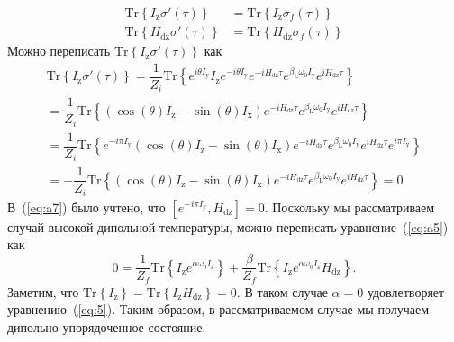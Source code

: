 \documentclass[utf8]{jetp}
\newcommand{\tr}[1]{\mathrm{Tr} \left\{ #1 \right\}}
\newcommand{\sx}{I_\mathrm{x}}
\newcommand{\sy}{I_\mathrm{y}}
\newcommand{\sz}{I_\mathrm{z}}
\newcommand{\hdz}{H_\mathrm{dz}}
\begin{document}
\begin{align}
  \label{eq:a5}
  \mathrm{Tr} \left\{ I_\mathrm{z} \sigma'(\tau) \right\}
  & = \mathrm{Tr} \left\{ I_\mathrm{z} \sigma_{f}(\tau) \right\}
  \\
  \label{eq:a6}
  \mathrm{Tr} \left\{ H_\mathrm{dz} \sigma'(\tau) \right\}
  & = \mathrm{Tr} \left\{ H_\mathrm{dz} \sigma_{f}(\tau) \right\}
\end{align}
%
Можно переписать $\mathrm{Tr} \left\{ I_\mathrm{z} \sigma'(\tau) \right\}$ как
%
\begin{multline}
  \label{eq:a7}
  \tr{I_\mathrm{z} \sigma'(\tau)}
  = \dfrac{1}{Z_{i}} \tr{
    e^{i \theta \sy} \sz e^{-i \theta \sy}
    e^{-i \hdz \tau} e^{\beta_\mathrm{L} \omega_{0} \sy} e^{i \hdz \tau}
  }
  \\
  = \dfrac{1}{Z_i} \tr{
    \left( \cos(\theta) \sz - \sin(\theta) \sx \right)
    e^{-i \hdz \tau} e^{\beta_\mathrm{L} \omega_{0} \sy} e^{i \hdz \tau}
  }
  \\
  = \dfrac{1}{Z_i} \tr{
    e^{-i \pi \sy}
    \left( \cos(\theta) \sz - \sin(\theta) \sx \right)
    e^{-i \hdz \tau} e^{\beta_\mathrm{L} \omega_{0} \sy} e^{i \hdz \tau}
    e^{i \pi \sy}
  }
  \\
  = - \dfrac{1}{Z_i} \tr{
    \left( \cos(\theta) \sz - \sin(\theta) \sx \right)
    e^{-i \hdz \tau} e^{\beta_\mathrm{L} \omega_{0} \sy} e^{i \hdz \tau}
  } = 0
\end{multline}
%
В~(\ref{eq:a7}) было учтено, что $\left[ e^{-i \pi \sy}, \hdz \right] = 0$.
Поскольку мы рассматриваем случай высокой дипольной температуры, можно переписать уравнение~(\ref{eq:a5}) как
\begin{equation}
  \label{eq:a8}
  0 = \dfrac{1}{Z_f} \tr{ \sz e^{\alpha \omega_0 \sz}}
  + \dfrac{\beta}{Z_f} \tr{\sz e^{\alpha \omega_0 \sz} \hdz}.
\end{equation}
%
Заметим, что $\tr{\sz} = \tr{\sz\hdz} = 0$.
В таком случае $\alpha = 0$ удовлетворяет уравнению~(\ref{eq:5}).
Таким образом, в рассматриваемом случае мы получаем дипольно упорядоченное состояние.


\end{document}
